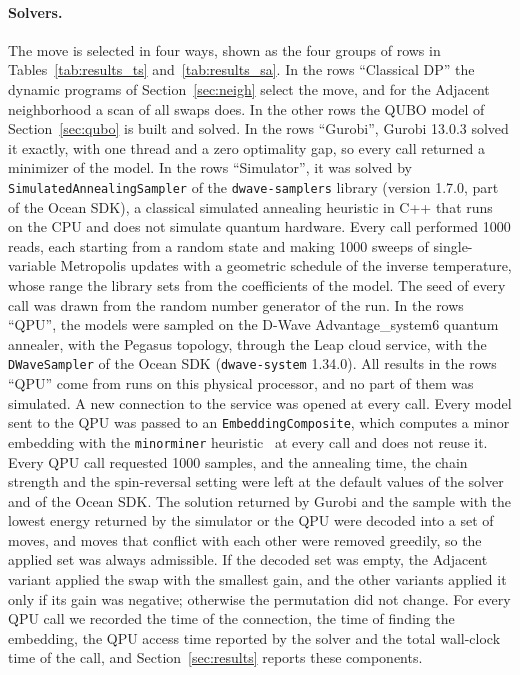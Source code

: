 \documentclass[10pt,twoside,twocolumn,a4paper]{article}
\newif\ifrevmarks \revmarksfalse
\newenvironment{revblock}{\ifrevmarks\color{red}\fi}{}
\begin{document}
\begin{revblock}
\paragraph{Solvers.} The move is selected in four ways, shown as the four groups of rows in Tables~\ref{tab:results_ts} and~\ref{tab:results_sa}. In the rows ``Classical DP'' the dynamic programs of Section~\ref{sec:neigh} select the move, and for the Adjacent neighborhood a scan of all swaps does. In the other rows the QUBO model of Section~\ref{sec:qubo} is built and solved. In the rows ``Gurobi'', Gurobi 13.0.3 solved it exactly, with one thread and a zero optimality gap, so every call returned a minimizer of the model. In the rows ``Simulator'', it was solved by \texttt{SimulatedAnnealingSampler} of the \texttt{dwave-samplers} library (version 1.7.0, part of the Ocean SDK), a classical simulated annealing heuristic in C++ that runs on the CPU and does not simulate quantum hardware. Every call performed 1000 reads, each starting from a random state and making 1000 sweeps of single-variable Metropolis updates with a geometric schedule of the inverse temperature, whose range the library sets from the coefficients of the model. The seed of every call was drawn from the random number generator of the run. In the rows ``QPU'', the models were sampled on the D-Wave Advantage\_system6 quantum annealer, with the Pegasus topology, through the Leap cloud service, with the \texttt{DWaveSampler} of the Ocean SDK (\texttt{dwave-system} 1.34.0). All results in the rows ``QPU'' come from runs on this physical processor, and no part of them was simulated. A new connection to the service was opened at every call. Every model sent to the QPU was passed to an \texttt{EmbeddingComposite}, which computes a minor embedding with the \texttt{minorminer} heuristic~\cite{Cai2014} at every call and does not reuse it. Every QPU call requested 1000 samples, and the annealing time, the chain strength and the spin-reversal setting were left at the default values of the solver and of the Ocean SDK. The solution returned by Gurobi and the sample with the lowest energy returned by the simulator or the QPU were decoded into a set of moves, and moves that conflict with each other were removed greedily, so the applied set was always admissible. If the decoded set was empty, the Adjacent variant applied the swap with the smallest gain, and the other variants applied it only if its gain was negative; otherwise the permutation did not change. For every QPU call we recorded the time of the connection, the time of finding the embedding, the QPU access time reported by the solver and the total wall-clock time of the call, and Section~\ref{sec:results} reports these components.


\end{revblock}
\end{document}
